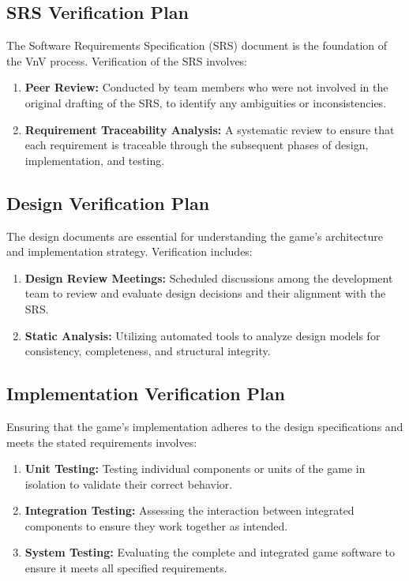 \documentclass[12pt]{article}
\begin{document}
\subsection{SRS Verification Plan}
The Software Requirements Specification (SRS) document is the foundation of the VnV process. Verification of the SRS involves:

\begin{enumerate}
    \item \textbf{Peer Review:} Conducted by team members who were not involved in the original drafting of the SRS, to identify any ambiguities or inconsistencies.
    \item \textbf{Requirement Traceability Analysis:} A systematic review to ensure that each requirement is traceable through the subsequent phases of design, implementation, and testing.
\end{enumerate}

\subsection{Design Verification Plan}
The design documents are essential for understanding the game's architecture and implementation strategy. Verification includes:

\begin{enumerate}
    \item \textbf{Design Review Meetings:} Scheduled discussions among the development team to review and evaluate design decisions and their alignment with the SRS.
    \item \textbf{Static Analysis:} Utilizing automated tools to analyze design models for consistency, completeness, and structural integrity.
\end{enumerate}

\subsection{Implementation Verification Plan}
Ensuring that the game's implementation adheres to the design specifications and meets the stated requirements involves:

\begin{enumerate}
    \item \textbf{Unit Testing:} Testing individual components or units of the game in isolation to validate their correct behavior.
    \item \textbf{Integration Testing:} Assessing the interaction between integrated components to ensure they work together as intended.
    \item \textbf{System Testing:} Evaluating the complete and integrated game software to ensure it meets all specified requirements.
\end{enumerate}
\end{document}
